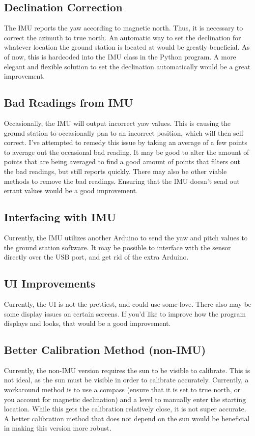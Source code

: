 \documentclass{article}
\begin{document}
\subsection{Declination Correction}
The IMU reports the yaw according to magnetic north. Thus, it is necessary to correct the azimuth to true north. An automatic way to set the declination for whatever location the ground station is located at would be greatly beneficial. As of now, this is hardcoded into the IMU class in the Python program. A more elegant and flexible solution to set the declination automatically would be a great improvement.

\subsection{Bad Readings from IMU}
Occasionally, the IMU will output incorrect yaw values. This is causing the ground station to occasionally pan to an incorrect position, which will then self correct. I've attempted to remedy this issue by taking an average of a few points to average out the occasional bad reading. It may be good to alter the amount of points that are being averaged to find a good amount of points that filters out the bad readings, but still reports quickly. There may also be other viable methods to remove the bad readings. Ensuring that the IMU doesn't send out errant values would be a good improvement. 

\subsection{Interfacing with IMU}
Currently, the IMU utilizes another Arduino to send the yaw and pitch values to the ground station software. It may be possible to interface with the sensor directly over the USB port, and get rid of the extra Arduino. 

\subsection{UI Improvements}
Currently, the UI is not the prettiest, and could use some love. There also may be some  display issues on certain screens. If you'd like to improve how the program displays and looks, that would be a good improvement. 

\subsection{Better Calibration Method (non-IMU)}
Currently, the non-IMU version requires the sun to be visible to calibrate. This is not ideal, as the sun must be visible in order to calibrate accurately. Currently, a workaround method is to use a compass (ensure that it is set to true north, or you account for magnetic declination) and a level to manually enter the starting location. While this gets the calibration relatively close, it is not super accurate. A better calibration method that does not depend on the sun would be beneficial in making this version more robust.
\end{document}
